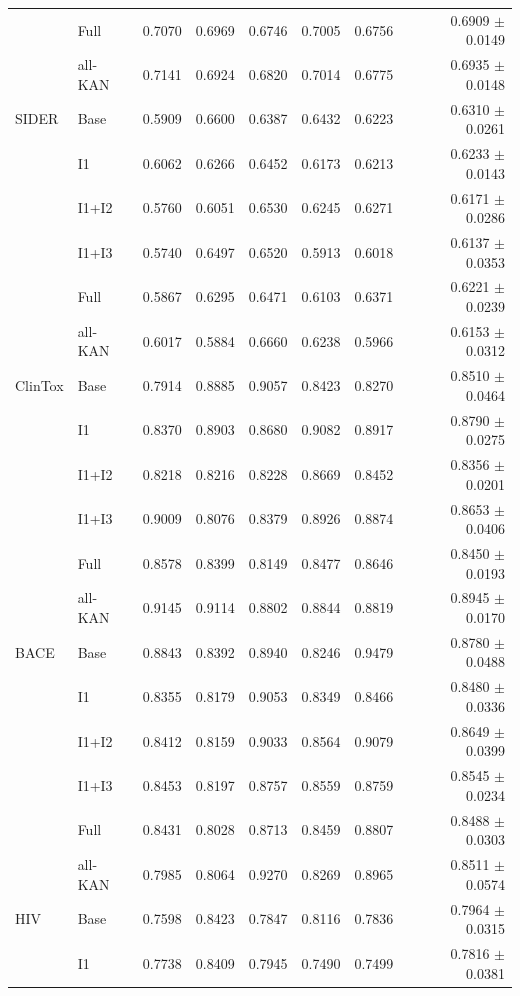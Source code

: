 \documentclass[journal=jcisd8,manuscript=article]{achemso}
\begin{document}
\begin{landscape}
\begin{longtable}{llrrrrrr}
 & Full & 0.7070 & 0.6969 & 0.6746 & 0.7005 & 0.6756 & 0.6909 $\pm$ 0.0149 \\
 & all-KAN & 0.7141 & 0.6924 & 0.6820 & 0.7014 & 0.6775 & 0.6935 $\pm$ 0.0148 \\
\midrule
SIDER & Base & 0.5909 & 0.6600 & 0.6387 & 0.6432 & 0.6223 & 0.6310 $\pm$ 0.0261 \\
 & I1 & 0.6062 & 0.6266 & 0.6452 & 0.6173 & 0.6213 & 0.6233 $\pm$ 0.0143 \\
 & I1+I2 & 0.5760 & 0.6051 & 0.6530 & 0.6245 & 0.6271 & 0.6171 $\pm$ 0.0286 \\
 & I1+I3 & 0.5740 & 0.6497 & 0.6520 & 0.5913 & 0.6018 & 0.6137 $\pm$ 0.0353 \\
 & Full & 0.5867 & 0.6295 & 0.6471 & 0.6103 & 0.6371 & 0.6221 $\pm$ 0.0239 \\
 & all-KAN & 0.6017 & 0.5884 & 0.6660 & 0.6238 & 0.5966 & 0.6153 $\pm$ 0.0312 \\
\midrule
ClinTox & Base & 0.7914 & 0.8885 & 0.9057 & 0.8423 & 0.8270 & 0.8510 $\pm$ 0.0464 \\
 & I1 & 0.8370 & 0.8903 & 0.8680 & 0.9082 & 0.8917 & 0.8790 $\pm$ 0.0275 \\
 & I1+I2 & 0.8218 & 0.8216 & 0.8228 & 0.8669 & 0.8452 & 0.8356 $\pm$ 0.0201 \\
 & I1+I3 & 0.9009 & 0.8076 & 0.8379 & 0.8926 & 0.8874 & 0.8653 $\pm$ 0.0406 \\
 & Full & 0.8578 & 0.8399 & 0.8149 & 0.8477 & 0.8646 & 0.8450 $\pm$ 0.0193 \\
 & all-KAN & 0.9145 & 0.9114 & 0.8802 & 0.8844 & 0.8819 & 0.8945 $\pm$ 0.0170 \\
\midrule
BACE & Base & 0.8843 & 0.8392 & 0.8940 & 0.8246 & 0.9479 & 0.8780 $\pm$ 0.0488 \\
 & I1 & 0.8355 & 0.8179 & 0.9053 & 0.8349 & 0.8466 & 0.8480 $\pm$ 0.0336 \\
 & I1+I2 & 0.8412 & 0.8159 & 0.9033 & 0.8564 & 0.9079 & 0.8649 $\pm$ 0.0399 \\
 & I1+I3 & 0.8453 & 0.8197 & 0.8757 & 0.8559 & 0.8759 & 0.8545 $\pm$ 0.0234 \\
 & Full & 0.8431 & 0.8028 & 0.8713 & 0.8459 & 0.8807 & 0.8488 $\pm$ 0.0303 \\
 & all-KAN & 0.7985 & 0.8064 & 0.9270 & 0.8269 & 0.8965 & 0.8511 $\pm$ 0.0574 \\
\midrule
HIV & Base & 0.7598 & 0.8423 & 0.7847 & 0.8116 & 0.7836 & 0.7964 $\pm$ 0.0315 \\
 & I1 & 0.7738 & 0.8409 & 0.7945 & 0.7490 & 0.7499 & 0.7816 $\pm$ 0.0381 \\

\end{longtable}
\end{landscape}
\end{document}

